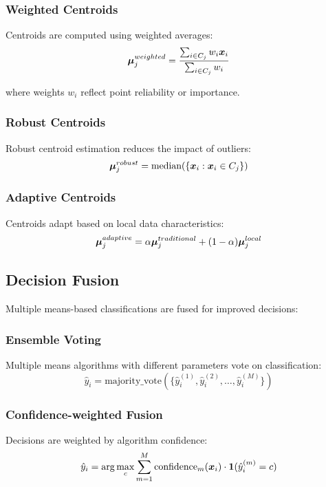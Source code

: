 \subsubsection{Weighted Centroids}
Centroids are computed using weighted averages:
\begin{equation}
\boldsymbol{\mu}_j^{weighted} = \frac{\sum_{i \in C_j} w_i \boldsymbol{x}_i}{\sum_{i \in C_j} w_i}
\end{equation}

where weights $w_i$ reflect point reliability or importance.

\subsubsection{Robust Centroids}
Robust centroid estimation reduces the impact of outliers:
\begin{equation}
\boldsymbol{\mu}_j^{robust} = \text{median}(\{\boldsymbol{x}_i : \boldsymbol{x}_i \in C_j\})
\end{equation}

\subsubsection{Adaptive Centroids}
Centroids adapt based on local data characteristics:
\begin{equation}
\boldsymbol{\mu}_j^{adaptive} = \alpha \boldsymbol{\mu}_j^{traditional} + (1-\alpha) \boldsymbol{\mu}_j^{local}
\end{equation}

\subsection{Decision Fusion}
Multiple means-based classifications are fused for improved decisions:

\subsubsection{Ensemble Voting}
Multiple means algorithms with different parameters vote on classification:
\begin{equation}
\hat{y}_i = \text{majority\_vote}(\{\hat{y}_i^{(1)}, \hat{y}_i^{(2)}, \ldots, \hat{y}_i^{(M)}\})
\end{equation}

\subsubsection{Confidence-weighted Fusion}
Decisions are weighted by algorithm confidence:
\begin{equation}
\hat{y}_i = \arg\max_c \sum_{m=1}^{M} \text{confidence}_m(\boldsymbol{x}_i) \cdot \mathbf{1}(\hat{y}_i^{(m)} = c)
\end{equation}

